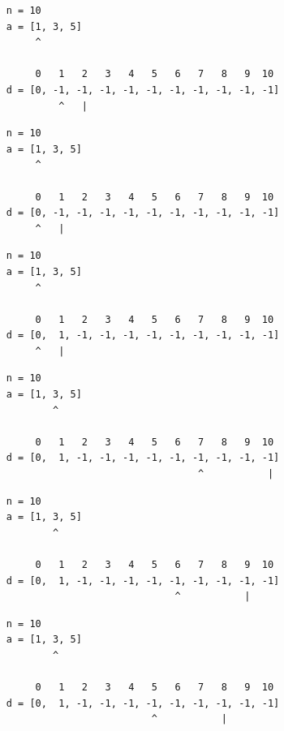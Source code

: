 \begin{frame}[fragile]
\begin{verbatim}
     n = 10
     a = [1, 3, 5]
          ^

          0   1   2   3   4   5   6   7   8   9  10
     d = [0, -1, -1, -1, -1, -1, -1, -1, -1, -1, -1]
              ^   |
\end{verbatim}
\end{frame}
\addtocounter{framenumber}{-1}

\begin{frame}[fragile]
\begin{verbatim}
     n = 10
     a = [1, 3, 5]
          ^

          0   1   2   3   4   5   6   7   8   9  10
     d = [0, -1, -1, -1, -1, -1, -1, -1, -1, -1, -1]
          ^   |
\end{verbatim}
\end{frame}
\addtocounter{framenumber}{-1}

\begin{frame}[fragile]
\begin{verbatim}
     n = 10
     a = [1, 3, 5]
          ^

          0   1   2   3   4   5   6   7   8   9  10
     d = [0,  1, -1, -1, -1, -1, -1, -1, -1, -1, -1]
          ^   |
\end{verbatim}
\end{frame}
\addtocounter{framenumber}{-1}

\begin{frame}[fragile]
\begin{verbatim}
     n = 10
     a = [1, 3, 5]
             ^

          0   1   2   3   4   5   6   7   8   9  10
     d = [0,  1, -1, -1, -1, -1, -1, -1, -1, -1, -1]
                                      ^           |
\end{verbatim}
\end{frame}
\addtocounter{framenumber}{-1}

\begin{frame}[fragile]
\begin{verbatim}
     n = 10
     a = [1, 3, 5]
             ^

          0   1   2   3   4   5   6   7   8   9  10
     d = [0,  1, -1, -1, -1, -1, -1, -1, -1, -1, -1]
                                  ^           |
\end{verbatim}
\end{frame}
\addtocounter{framenumber}{-1}

\begin{frame}[fragile]
\begin{verbatim}
     n = 10
     a = [1, 3, 5]
             ^

          0   1   2   3   4   5   6   7   8   9  10
     d = [0,  1, -1, -1, -1, -1, -1, -1, -1, -1, -1]
                              ^           |
\end{verbatim}
\end{frame}
\addtocounter{framenumber}{-1}

